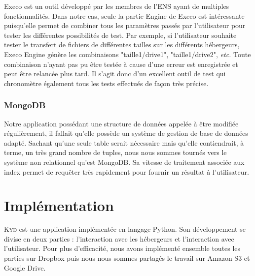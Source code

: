 \documentclass[10pt]{article}
\newcommand{\KYD}{\textsc{Kyd}\xspace}
\begin{document}
Execo est un outil développé par les membres de l'ENS ayant de
multiples fonctionnalités. Dans notre cas, seule la partie Engine de
Execo est intéressante puisqu'elle permet de combiner tous les
paramètres passés par l'utilisateur pour tester les différentes
possibilités de test. Par exemple, si l'utilisateur souhaite tester le
transfert de fichiers de différentes tailles sur les différents
hébergeurs, Execo Engine génère les combinaisons "taille1/drive1",
"taille1/drive2", \textit{etc.} Toute combinaison n'ayant pas pu être testée
à cause d'une erreur est enregistrée et peut être relancée plus
tard. Il s'agit donc d'un excellent outil de test qui chronomètre
également tous les tests effectués de façon très précise.

\subsubsection{MongoDB}

Notre application possédant une structure de données appelée à être modifiée
régulièrement, il fallait qu'elle possède un système de gestion de base de
données adapté. Sachant qu'une seule table serait nécessaire mais qu'elle
contiendrait, à terme, un très grand nombre de tuples, nous nous sommes tournés
vers le système non relationnel qu'est MongoDB. Sa vitesse de traitement
associée aux index permet de requêter très rapidement pour fournir un résultat à
l'utilisateur.

\section{Implémentation}

\KYD est une application implémentée en langage Python. Son
développement se divise en deux parties : l'interaction avec les
hébergeurs et l'interaction avec l'utilisateur. Pour plus
d'efficacité, nous avons implémenté ensemble toutes les parties sur
Dropbox puis nous nous sommes partagés le travail sur Amazon S3 et
Google Drive.
\end{document}
